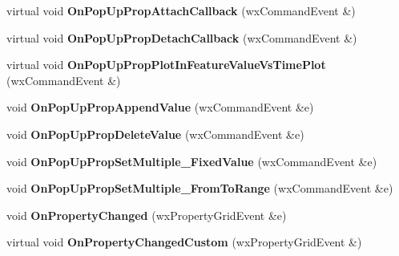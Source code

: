 \begin{DoxyCompactItemize}
\item 
\hypertarget{class_prop_grid_frame_base_a439af29613de38963c3b0be15a8e9f3f}{virtual void {\bfseries On\+Pop\+Up\+Prop\+Attach\+Callback} (wx\+Command\+Event \&)}\label{class_prop_grid_frame_base_a439af29613de38963c3b0be15a8e9f3f}

\item 
\hypertarget{class_prop_grid_frame_base_a23b7db2c2ae6a0996eb05eaaa953934b}{virtual void {\bfseries On\+Pop\+Up\+Prop\+Detach\+Callback} (wx\+Command\+Event \&)}\label{class_prop_grid_frame_base_a23b7db2c2ae6a0996eb05eaaa953934b}

\item 
\hypertarget{class_prop_grid_frame_base_a0733fb0319de6742b6c99ca31d58a0d0}{virtual void {\bfseries On\+Pop\+Up\+Prop\+Plot\+In\+Feature\+Value\+Vs\+Time\+Plot} (wx\+Command\+Event \&)}\label{class_prop_grid_frame_base_a0733fb0319de6742b6c99ca31d58a0d0}

\item 
\hypertarget{class_prop_grid_frame_base_ad62082c3983ece46f9cd14d8bf19734b}{void {\bfseries On\+Pop\+Up\+Prop\+Append\+Value} (wx\+Command\+Event \&e)}\label{class_prop_grid_frame_base_ad62082c3983ece46f9cd14d8bf19734b}

\item 
\hypertarget{class_prop_grid_frame_base_ab75b22a172b3f8e7bbbadb19b7a81a55}{void {\bfseries On\+Pop\+Up\+Prop\+Delete\+Value} (wx\+Command\+Event \&e)}\label{class_prop_grid_frame_base_ab75b22a172b3f8e7bbbadb19b7a81a55}

\item 
\hypertarget{class_prop_grid_frame_base_af1146653c8eb4a5fc2571b1046bdaa15}{void {\bfseries On\+Pop\+Up\+Prop\+Set\+Multiple\+\_\+\+Fixed\+Value} (wx\+Command\+Event \&e)}\label{class_prop_grid_frame_base_af1146653c8eb4a5fc2571b1046bdaa15}

\item 
\hypertarget{class_prop_grid_frame_base_a5a46bc09d8654fe2b8c24c2eba681357}{void {\bfseries On\+Pop\+Up\+Prop\+Set\+Multiple\+\_\+\+From\+To\+Range} (wx\+Command\+Event \&e)}\label{class_prop_grid_frame_base_a5a46bc09d8654fe2b8c24c2eba681357}

\item 
\hypertarget{class_prop_grid_frame_base_a2b2d55519765b6b1de4fc681f9a12ee0}{void {\bfseries On\+Property\+Changed} (wx\+Property\+Grid\+Event \&e)}\label{class_prop_grid_frame_base_a2b2d55519765b6b1de4fc681f9a12ee0}

\item 
\hypertarget{class_prop_grid_frame_base_a75a25f8dff54ab6ca4d3bb00e286cabf}{virtual void {\bfseries On\+Property\+Changed\+Custom} (wx\+Property\+Grid\+Event \&)}\label{class_prop_grid_frame_base_a75a25f8dff54ab6ca4d3bb00e286cabf}


\end{DoxyCompactItemize}
